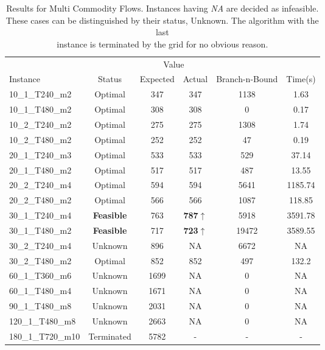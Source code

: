 \begin{center}
\begin{center}
\begin{table}[H]
    \begin{tabular}{ l c c c c c }
    \hline
    &&\multicolumn{2}{c}{Value} && \\
    \cmidrule(r){3-4}
    Instance & Status & Expected & Actual & Branch-n-Bound & Time(s) \\ \hline
    10\_1\_T240\_m2 & Optimal & 347& 347 & 1138 & 1.63 \\
	10\_1\_T480\_m2 & Optimal & 308& 308 & 0 & 0.17 \\
	10\_2\_T240\_m2 & Optimal & 275& 275 & 1308 & 1.74 \\
	10\_2\_T480\_m2 & Optimal & 252& 252 & 47 & 0.19 \\
	20\_1\_T240\_m3 & Optimal & 533& 533 & 529 & 37.14 \\
	20\_1\_T480\_m2 & Optimal & 517 & 517 & 487 & 13.55 \\
	20\_2\_T240\_m4 & Optimal & 594& 594 & 5641 & 1185.74 \\
	20\_2\_T480\_m2 & Optimal & 566& 566 & 1087 & 118.85 \\
	30\_1\_T240\_m4 & {\bf Feasible} & 763& {\bf 787}$\uparrow$ & 5918 & 3591.78
	\\
	30\_1\_T480\_m2 & {\bf Feasible} & 717& {\bf 723}$\uparrow$ & 19472 & 3589.55
	\\
	30\_2\_T240\_m4 & Unknown & 896& NA & 6672 & NA \\
	30\_2\_T480\_m2 & Optimal & 852& 852 & 497 & 132.2 \\
	60\_1\_T360\_m6 & Unknown & 1699& NA  & 0 & NA \\
	60\_1\_T480\_m4 & Unknown & 1671& NA & 0 & NA \\
	90\_1\_T480\_m8 & Unknown & 2031& NA & 0 & NA \\
	120\_1\_T480\_m8 & Unknown & 2663& NA  & 0 & NA \\
	180\_1\_T720\_m10 & Terminated & 5782 & - & - & - \\
    \hline
    \end{tabular}
    \caption{\label{tab:mcf} Results for Multi Commodity Flows. Instances
    having {\it NA} are decided as infeasible. \\ These cases can be
    distinguished by their status, Unknown. 
    The
    algorithm with the last\\
    instance is terminated by the grid for no obvious reason.}
    
\end{table}


\end{center}
\end{center}
